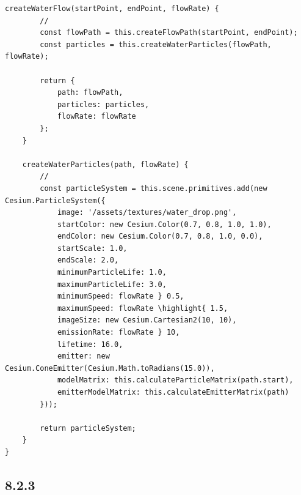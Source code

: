 \begin{lstlisting}[style=javascript]
    createWaterFlow(startPoint, endPoint, flowRate) {
        // 
        const flowPath = this.createFlowPath(startPoint, endPoint);
        const particles = this.createWaterParticles(flowPath, flowRate);
        
        return {
            path: flowPath,
            particles: particles,
            flowRate: flowRate
        };
    }
    
    createWaterParticles(path, flowRate) {
        // 
        const particleSystem = this.scene.primitives.add(new Cesium.ParticleSystem({
            image: '/assets/textures/water_drop.png',
            startColor: new Cesium.Color(0.7, 0.8, 1.0, 1.0),
            endColor: new Cesium.Color(0.7, 0.8, 1.0, 0.0),
            startScale: 1.0,
            endScale: 2.0,
            minimumParticleLife: 1.0,
            maximumParticleLife: 3.0,
            minimumSpeed: flowRate } 0.5,
            maximumSpeed: flowRate \highlight{ 1.5,
            imageSize: new Cesium.Cartesian2(10, 10),
            emissionRate: flowRate } 10,
            lifetime: 16.0,
            emitter: new Cesium.ConeEmitter(Cesium.Math.toRadians(15.0)),
            modelMatrix: this.calculateParticleMatrix(path.start),
            emitterModelMatrix: this.calculateEmitterMatrix(path)
        }));
        
        return particleSystem;
    }
}
\end{lstlisting}

\hypertarget{section-77}{%
\subsection{8.2.3}\label{section-77}}

\hypertarget{section-78}{%
\subsubsection{}\label{section-78}}

\hypertarget{section-79}{%
\paragraph{}\label{section-79}}

